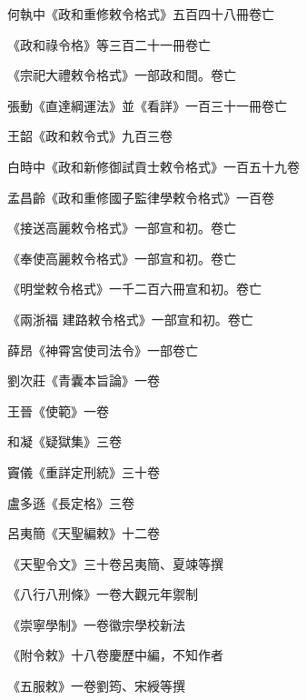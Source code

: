 \begin{pinyinscope}
 何執中《政和重修敕令格式》五百四十八冊卷亡



 《政和祿令格》等三百二十一冊卷亡



 《宗祀大禮敕令格式》一部政和間。卷亡



 張動《直達綱運法》並《看詳》一百三十一冊卷亡



 王韶《政和敕令式》九百三卷



 白時中《政和新修御試貢士敕令格式》一百五十九卷



 孟昌齡《政和重修國子監律學敕令格式》一百卷



 《接送高麗敕令格式》一部宣和初。卷亡



 《奉使高麗敕令格式》一部宣和初。卷亡



 《明堂敕令格式》一千二百六冊宣和初。卷亡



 《兩浙福
 建路敕令格式》一部宣和初。卷亡



 薛昂《神霄宮使司法令》一部卷亡



 劉次莊《青囊本旨論》一卷



 王晉《使範》一卷



 和凝《疑獄集》三卷



 竇儀《重詳定刑統》三十卷



 盧多遜《長定格》三卷



 呂夷簡《天聖編敕》十二卷



 《天聖令文》三十卷呂夷簡、夏竦等撰



 《八行八刑條》一卷大觀元年禦制



 《崇寧學制》一卷徽宗學校新法



 《附令敕》十八卷慶歷中編，不知作者



 《五服敕》一卷劉筠、宋綬等撰




\end{pinyinscope}

